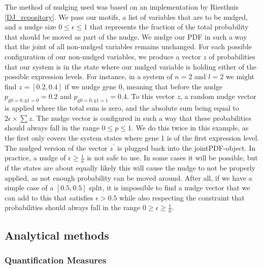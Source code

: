 \documentclass[../main.tex]{subfiles}
\begin{document}
The method of nudging used was based on an implementation by Riesthuis \ref{DJ_repository}.
We pass our motifs, a list of variables that are to be nudged, and a nudge size $0 \le \epsilon \le 1$ that represents the fraction of the total probability that should be moved as part of the nudge.
We nudge our PDF in such a way that the joint of all non-nudged variables remains unchanged. %
For each possible configuration of our non-nudged variables, we produce a vector $z$ of probabilities that our system is in the state where our nudged variable is holding either of the possible expression levels.
For instance, in a system of $n=2$ and $l=2$ we might find $z = [0.2, 0.4]$ if we nudge gene 0, meaning that before the nudge $p_\mathrm{g0 = 0, g1=0} = 0.2$ and $p_\mathrm{g0 = 0, g1=1} = 0.4$.
To this vector $z$, a random nudge vector is applied where the total sum is zero, and the absolute sum being equal to $2 \epsilon \times \sum z$. %
The nudge vector is configured in such a way that these probabilities should always fall in the range $0 \le p \le 1$.
We do this twice in this example, as the first only covers the system states where gene 1 is of the first expression level.
The nudged version of the vector $z^\prime$ is plugged back into the jointPDF-object.
In practice, a nudge of $\epsilon \ge \frac{1}{n}$ is not safe to use.
In some cases it will be possible, but if the states are about equally likely this will cause the nudge to not be properly applied, as not enough probability can be moved around.
After all, if we have a simple case of a $[0.5, 0.5]$ split, it is impossible to find a nudge vector that we can add to this that satisfies $\epsilon > 0.5$ while also respecting the constraint that probabilities should always fall in the range $0 \ge \epsilon \ge \frac{1}{n}$.

\subsection{Analytical methods}

\subsubsection{Quantification Measures}
\end{document}
